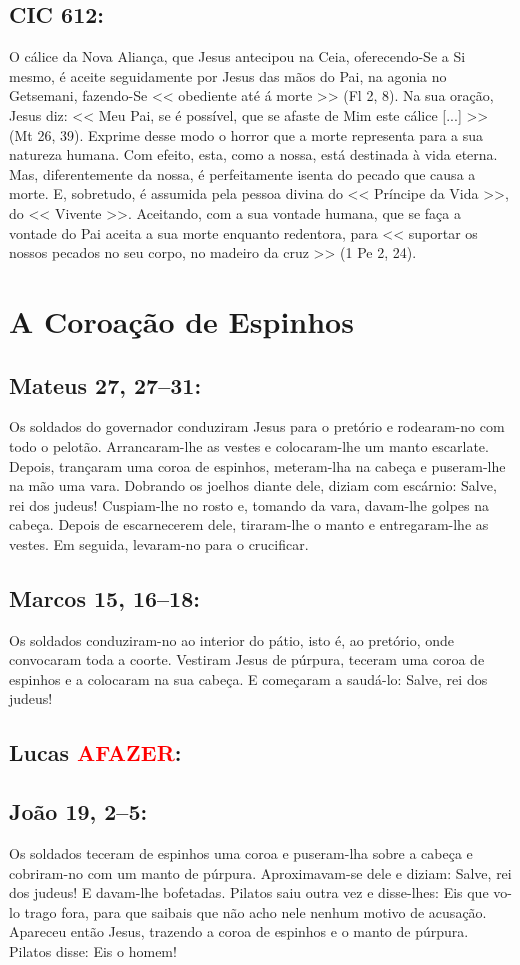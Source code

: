 \documentclass[10pt,a5paper]{book}
\newcommand{\from}[1]{\subsection*{#1}}
\newcommand{\TODO}{\textcolor{red}{\ttfamily AFAZER}}
\begin{document}
\from{CIC 612:}

O cálice da Nova Aliança, que Jesus antecipou na Ceia, oferecendo-Se a Si mesmo, é aceite seguidamente por Jesus das mãos do Pai, na agonia no Getsemani, fazendo-Se << obediente até á morte >> (Fl 2, 8).
Na sua oração, Jesus diz:
<< Meu Pai, se é possível, que se afaste de Mim este cálice [...] >> (Mt 26, 39).
Exprime desse modo o horror que a morte representa para a sua natureza humana.
Com efeito, esta, como a nossa, está destinada à vida eterna.
Mas, diferentemente da nossa, é perfeitamente isenta do pecado que causa a morte.
E, sobretudo, é assumida pela pessoa divina do << Príncipe da Vida >>, do << Vivente >>.
Aceitando, com a sua vontade humana, que se faça a vontade do Pai aceita a sua morte enquanto redentora, para << suportar os nossos pecados no seu corpo, no madeiro da cruz >> (1 Pe 2, 24).


\section{A Coroação de Espinhos}

\from{Mateus 27, 27--31:}

Os soldados do governador conduziram Jesus para o pretório e rodearam-no com todo o pelotão.
Arrancaram-lhe as vestes e colocaram-lhe um manto escarlate.
Depois, trançaram uma coroa de espinhos, meteram-lha na cabeça e puseram-lhe na mão uma vara.
Dobrando os joelhos diante dele, diziam com escárnio:
Salve, rei dos judeus!
Cuspiam-lhe no rosto e, tomando da vara, davam-lhe golpes na cabeça.
Depois de escarnecerem dele, tiraram-lhe o manto e entregaram-lhe as vestes.
Em seguida, levaram-no para o crucificar.

\from{Marcos 15, 16--18:}

Os soldados conduziram-no ao interior do pátio, isto é, ao pretório, onde convocaram toda a coorte.
Vestiram Jesus de púrpura, teceram uma coroa de espinhos e a colocaram na sua cabeça.
E começaram a saudá-lo: Salve, rei dos judeus!

\from{Lucas \TODO:}

\from{João 19, 2--5:}

Os soldados teceram de espinhos uma coroa e puseram-lha sobre a cabeça e cobriram-no com um manto de púrpura.
Aproximavam-se dele e diziam:
Salve, rei dos judeus! E davam-lhe bofetadas.
Pilatos saiu outra vez e disse-lhes:
Eis que vo-lo trago fora, para que saibais que não acho nele nenhum motivo de acusação.
Apareceu então Jesus, trazendo a coroa de espinhos e o manto de púrpura.
Pilatos disse:
Eis o homem!
\end{document}
